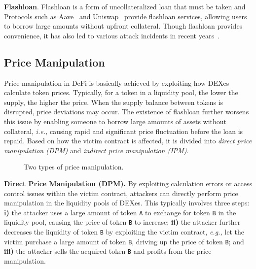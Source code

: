\noindent
\textbf{Flashloan}. Flashloan is a form of uncollateralized loan that must be taken and 
Protocols such as Aave~\cite{aave} and Uniswap~\cite{uniswap} provide flashloan services, allowing users to borrow large amounts without upfront collateral. 
Though flashloan provides convenience, it has also led to various attack incidents in recent years~\cite{wang2020towards, qin2021attacking}.



\subsection{Price Manipulation}
\label{sec:pm}
Price manipulation in DeFi is basically achieved by exploiting how DEXes calculate token prices.
Typically, for a token in a liquidity pool, the lower the supply, the higher the price. When the supply balance between tokens is disrupted, price deviations may occur. 
The existence of flashloan further worsens this issue by enabling someone to borrow large amounts of assets without collateral, \textit{i.e.,} causing rapid and significant price fluctuation before the loan is repaid.
Based on how the victim contract is affected, it is divided into \textit{direct price manipulation (DPM)} and \textit{indirect price manipulation (IPM)}.


\begin{figure}[t]
    \centering
    \hspace{0.02\columnwidth} 
    \vspace{-0.2in}
    \caption{Two types of price manipulation.}
    \vspace{-0.1in}
    \label{fig:pm}
\end{figure}

\noindent
\textbf{Direct Price Manipulation (DPM).}
\label{sec:dpm}
By exploiting calculation errors or access control issues within the victim contract, attackers can directly perform price manipulation in the liquidity pools of DEXes. 
This typically involves three steps: \textbf{i)} the attacker uses a large amount of token \texttt{A} to exchange for token \texttt{B} in the liquidity pool, causing the price of token \texttt{B} to increase; \textbf{ii)} the attacker further decreases the liquidity of token \texttt{B} by exploiting the victim contract, \textit{e.g.,} let the victim purchase a large amount of token \texttt{B}, driving up the price of token \texttt{B}; and \textbf{iii)} the attacker sells the acquired token \texttt{B} and profits from the price manipulation.

